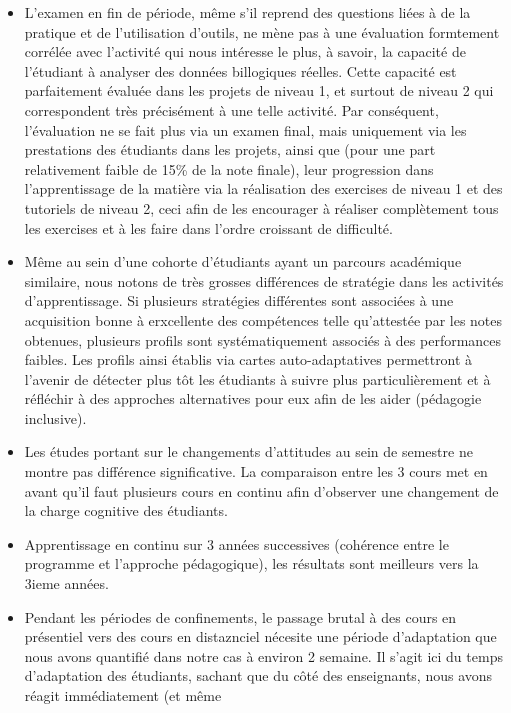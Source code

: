 \documentclass[
]{article}
\begin{document}
\begin{itemize}
\item
  L'examen en fin de période, même s'il reprend des questions liées à de
  la pratique et de l'utilisation d'outils, ne mène pas à une évaluation
  formtement corrélée avec l'activité qui nous intéresse le plus, à
  savoir, la capacité de l'étudiant à analyser des données billogiques
  réelles. Cette capacité est parfaitement évaluée dans les projets de
  niveau 1, et surtout de niveau 2 qui correspondent très précisément à
  une telle activité. Par conséquent, l'évaluation ne se fait plus via
  un examen final, mais uniquement via les prestations des étudiants
  dans les projets, ainsi que (pour une part relativement faible de 15\%
  de la note finale), leur progression dans l'apprentissage de la
  matière via la réalisation des exercises de niveau 1 et des tutoriels
  de niveau 2, ceci afin de les encourager à réaliser complètement tous
  les exercises et à les faire dans l'ordre croissant de difficulté.
\item
  Même au sein d'une cohorte d'étudiants ayant un parcours académique
  similaire, nous notons de très grosses différences de stratégie dans
  les activités d'apprentissage. Si plusieurs stratégies différentes
  sont associées à une acquisition bonne à erxcellente des compétences
  telle qu'attestée par les notes obtenues, plusieurs profils sont
  systématiquement associés à des performances faibles. Les profils
  ainsi établis via cartes auto-adaptatives permettront à l'avenir de
  détecter plus tôt les étudiants à suivre plus particulièrement et à
  réfléchir à des approches alternatives pour eux afin de les aider
  (pédagogie inclusive).
\item
  Les études portant sur le changements d'attitudes au sein de semestre
  ne montre pas différence significative. La comparaison entre les 3
  cours met en avant qu'il faut plusieurs cours en continu afin
  d'observer une changement de la charge cognitive des étudiants.
\item
  Apprentissage en continu sur 3 années successives (cohérence entre le
  programme et l'approche pédagogique), les résultats sont meilleurs
  vers la 3ieme années.
\item
  Pendant les périodes de confinements, le passage brutal à des cours en
  présentiel vers des cours en distaznciel nécesite une période
  d'adaptation que nous avons quantifié dans notre cas à environ 2
  semaine. Il s'agit ici du temps d'adaptation des étudiants, sachant
  que du côté des enseignants, nous avons réagit immédiatement (et même

\end{itemize}
\end{document}

